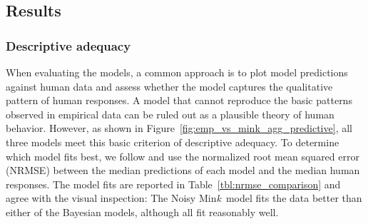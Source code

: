 \documentclass[doc,floatsintext]{apa6}
\newcommand{\mink}{{Min\textit{k}\ }}
\begin{document}
\subsection{Results}


\subsubsection{Descriptive adequacy}

When evaluating the models, a common approach is to plot model predictions against human data and assess whether the model captures the qualitative pattern of human responses. A model that cannot reproduce the basic patterns observed in empirical data can be ruled out as a plausible theory of human behavior. However, as shown in Figure~\ref{fig:emp_vs_mink_agg_predictive}, all three models meet this basic criterion of descriptive adequacy. To determine which model fits best, we follow  and use the normalized root mean squared error (NRMSE) between the median predictions of each model and the median human responses. The model fits are reported in Table~\ref{tbl:nrmse_comparison} and agree with the visual inspection: The Noisy \mink model fits the data better than either of the Bayesian models, although all fit reasonably well.
\end{document}
